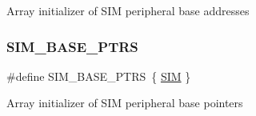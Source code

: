 Array initializer of S\+IM peripheral base addresses \mbox{\label{group___s_i_m___peripheral___access___layer_ga2fd213a3b9fc7d761ab0cdeb74c34f91}} 
\subsubsection{\texorpdfstring{SIM\_BASE\_PTRS}{SIM\_BASE\_PTRS}}
{\footnotesize\ttfamily \#define S\+I\+M\+\_\+\+B\+A\+S\+E\+\_\+\+P\+T\+RS~\{ \mbox{\hyperlink{group___s_i_m___peripheral___access___layer_ga3dd2f4c4bfb41778902b4b5350143d9e}{S\+IM}} \}}

Array initializer of S\+IM peripheral base pointers 